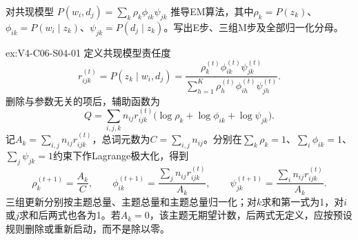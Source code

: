 \begin{SLChapterExercisePairSection}
\begin{exercise}\label{ex:V4-C06-S04-01}
对共现模型
$P(w_i,d_j)=\sum_k\rho_k\phi_{ik}\psi_{jk}$
推导EM算法，其中$\rho_k=P(z_k)$、$\phi_{ik}=P(w_i\mid z_k)$、$\psi_{jk}=P(d_j\mid z_k)$。写出E步、三组M步及全部归一化分母。
\end{exercise}
\ifSLFullEdition
{}\label{sol:V4-C06-S04-01}
\begin{chapterexercisesolution}{ex:V4-C06-S04-01}
定义共现模型责任度
\[
r_{ijk}^{(t)}
=P(z_k\mid w_i,d_j)
=\frac{\rho_k^{(t)}\phi_{ik}^{(t)}\psi_{jk}^{(t)}}
{\sum_{h=1}^K\rho_h^{(t)}\phi_{ih}^{(t)}\psi_{jh}^{(t)}}.
\]
删除与参数无关的项后，辅助函数为
\[
Q=\sum_{i,j,k}n_{ij}r_{ijk}^{(t)}
\bigl(\log\rho_k+\log\phi_{ik}+\log\psi_{jk}\bigr).
\]
记$A_k=\sum_{i,j}n_{ij}r_{ijk}^{(t)}$，总词元数为$C=\sum_{i,j}n_{ij}$。分别在$\sum_k\rho_k=1$、$\sum_i\phi_{ik}=1$、$\sum_j\psi_{jk}=1$约束下作Lagrange极大化，得到
\[
\rho_k^{(t+1)}=\frac{A_k}{C},\qquad
\phi_{ik}^{(t+1)}=
\frac{\sum_jn_{ij}r_{ijk}^{(t)}}{A_k},\qquad
\psi_{jk}^{(t+1)}=
\frac{\sum_in_{ij}r_{ijk}^{(t)}}{A_k}.
\]
三组更新分别按主题总量、主题总量和主题总量归一化；对$k$求和第一式为1，对$i$或$j$求和后两式也各为1。若$A_k=0$，该主题无期望计数，后两式无定义，应按预设规则删除或重新启动，而不是除以零。
\end{chapterexercisesolution}
\fi


\end{SLChapterExercisePairSection}
